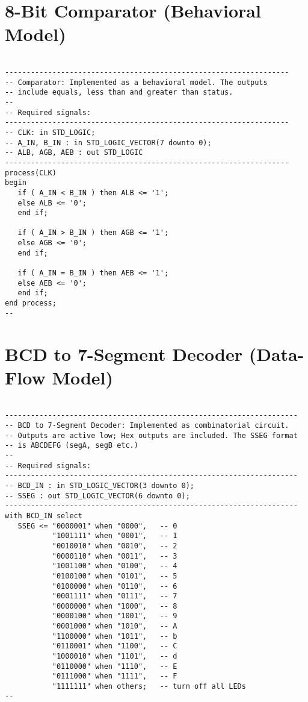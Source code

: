 \section{8-Bit Comparator (Behavioral Model)}

\noindent
\begin{minipage}{0.99\linewidth}
\begin{lstlisting}

------------------------------------------------------------------
-- Comparator: Implemented as a behavioral model. The outputs 
-- include equals, less than and greater than status.  
-- 
-- Required signals: 
------------------------------------------------------------------
-- CLK: in STD_LOGIC;
-- A_IN, B_IN : in STD_LOGIC_VECTOR(7 downto 0);
-- ALB, AGB, AEB : out STD_LOGIC
------------------------------------------------------------------
process(CLK)
begin
   if ( A_IN < B_IN ) then ALB <= '1';
   else ALB <= '0';
   end if;
    
   if ( A_IN > B_IN ) then AGB <= '1';
   else AGB <= '0';
   end if;
    
   if ( A_IN = B_IN ) then AEB <= '1';
   else AEB <= '0';
   end if;    
end process;
--
\end{lstlisting}
\end{minipage}

\section{BCD to 7-Segment Decoder (Data-Flow Model)}

\noindent
\begin{minipage}{0.99\linewidth}
\begin{lstlisting}

--------------------------------------------------------------------
-- BCD to 7-Segment Decoder: Implemented as combinatorial circuit.  
-- Outputs are active low; Hex outputs are included. The SSEG format
-- is ABCDEFG (segA, segB etc.)
--
-- Required signals: 
--------------------------------------------------------------------
-- BCD_IN : in STD_LOGIC_VECTOR(3 downto 0);
-- SSEG : out STD_LOGIC_VECTOR(6 downto 0); 
--------------------------------------------------------------------
with BCD_IN select
   SSEG <= "0000001" when "0000",   -- 0
           "1001111" when "0001",   -- 1
           "0010010" when "0010",   -- 2
           "0000110" when "0011",   -- 3
           "1001100" when "0100",   -- 4
           "0100100" when "0101",   -- 5
           "0100000" when "0110",   -- 6
           "0001111" when "0111",   -- 7
           "0000000" when "1000",   -- 8
           "0000100" when "1001",   -- 9
           "0001000" when "1010",   -- A
           "1100000" when "1011",   -- b
           "0110001" when "1100",   -- C
           "1000010" when "1101",   -- d
           "0110000" when "1110",   -- E
           "0111000" when "1111",   -- F
           "1111111" when others;   -- turn off all LEDs
--
\end{lstlisting}
\end{minipage}

